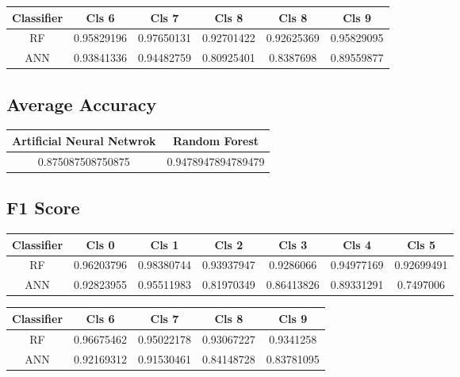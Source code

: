 \documentclass[12pt,a4paper]{article}
\begin{document}
\begin{center}
\begin{tabular}{ || c c c c c c || } 
\hline
Classifier & Cls 6 & Cls 7 & Cls 8 & Cls 8 & Cls 9\\
 \hline
 RF & 0.95829196 & 0.97650131 & 0.92701422 & 0.92625369 & 0.95829095\\ 
\hline
ANN & 0.93841336 & 0.94482759 & 0.80925401 & 0.8387698 & 0.89559877\\
 \hline
\end{tabular}
\end{center}

\subsection{Average Accuracy}
\begin{center}
\begin{tabular}{ || c c || } 
\hline
Artificial Neural Netwrok & Random Forest\\
\hline
0.875087508750875 & 0.9478947894789479\\
 \hline
\end{tabular}
\end{center}

\subsection{F1 Score}
\begin{center}
\begin{tabular}{ || c c c c c c c|| } 
\hline
Classifier & Cls 0 & Cls 1 & Cls 2 & Cls 3 & Cls 4 & Cls 5\\
 \hline
 RF & 0.96203796 & 0.98380744 & 0.93937947 & 0.9286066 & 0.94977169 & 0.92699491\\ 
\hline
ANN & 0.92823955 & 0.95511983 & 0.81970349 & 0.86413826 & 0.89331291 & 0.7497006\\
 \hline
\end{tabular}
\end{center}

\begin{center}
\begin{tabular}{ || c c c c  c || } 
\hline
Classifier & Cls 6 & Cls 7 & Cls 8  & Cls 9\\
 \hline
 RF & 0.96675462 & 0.95022178 & 0.93067227 & 0.9341258\\ 
\hline
ANN & 0.92169312 & 0.91530461 & 0.84148728 & 0.83781095\\
 \hline
\end{tabular}
\end{center}
\end{document}
